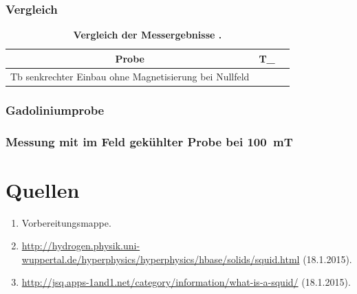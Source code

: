 \documentclass[a4paper,ngerman]{scrartcl}
\begin{document}
\subsubsection{Vergleich}




\begin{table}[tb!]
\centering
\caption[Vergleich]{\textbf{Vergleich der Messergebnisse .} }
\begin{tabular}{ccc}
\toprule
Probe	&	T_{\mathrm{C}}	\\
\midrule
Tb senkrechter Einbau ohne Magnetisierung bei Nullfeld
\bottomrule
\end{tabular}
\label{teb:vergleich}
\end{table}








\subsubsection{Gadoliniumprobe}

\subsubsection*{Messung mit im Feld gekühlter Probe bei \SI{100}{mT}}







\section{Quellen}
\begin{enumerate}
\item Vorbereitungsmappe.\label{ref:mappe}
\item \url{http://hydrogen.physik.uni-wuppertal.de/hyperphysics/hyperphysics/hbase/solids/squid.html} (18.1.2015).\label{ref:wuppertal}
\item \url{http://jsq.apps-1and1.net/category/information/what-is-a-squid/} (18.1.2015).
\label{ref:jsq}
\end{enumerate}
\end{document}

